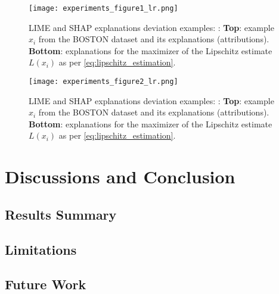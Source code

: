 \documentclass[english]{tktltiki2}
\theoremstyle{definition}
\theoremstyle{remark}
\begin{document}
\begin{center}
	\begin{figure}[H]
		\texttt{[image: experiments\_figure1\_lr.png]}
		\vspace*{-10mm}
		\caption{LIME and SHAP explanations deviation examples: \citep{alvarez2018robustness}: \textbf{Top}: example $x_i$ from the BOSTON dataset and its explanations (attributions). \textbf{Bottom}: explanations for the maximizer of the Lipschitz estimate $L(x_i)$ as per \eqref{eq:lipschitz_estimation}.}
		\label{fig:experiments_figure1_lr}
	\end{figure}
\end{center}

\begin{figure}[H]
	\texttt{[image: experiments\_figure2\_lr.png]}
	\vspace*{-10mm}
	\caption{LIME and SHAP explanations deviation examples: \citep{alvarez2018robustness}: \textbf{Top}: example $x_i$ from the BOSTON dataset and its explanations (attributions). \textbf{Bottom}: explanations for the maximizer of the Lipschitz estimate $L(x_i)$ as per \eqref{eq:lipschitz_estimation}.}
	\label{fig:experiments_figure2_lr}
\end{figure} 





\section{Discussions and Conclusion}\label{sec:conclusion} %
\subsection{Results Summary} %
\subsection{Limitations} %
\subsection{Future Work} %
\end{document}
